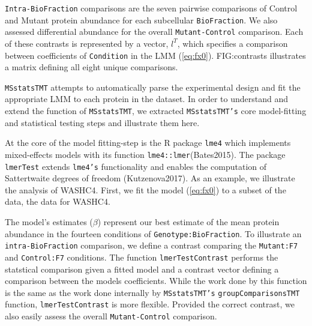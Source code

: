 \documentclass[11pt]{elife}
\begin{document}
\texttt{Intra-BioFraction} comparisons are the seven pairwise comparisons of 
Control and Mutant protein abundance for each subcellular
\texttt{BioFraction}. We also assessed differential abundance for the 
overall \texttt{Mutant-Control} comparison. Each of these contrasts is 
represented by a vector, $l^T$, which specifies a comparison between 
coefficients of \texttt{Condition} in the LMM (\ref{eq:fx0}).
FIG:contrasts illustrates a matrix defining all eight unique comparisons.

\texttt{MSstatsTMT} attempts to automatically parse the experimental design and
fit the appropriate LMM to each protein in the dataset. In order to understand 
and extend the function of \texttt{MSstatsTMT}, 
we extracted \texttt{MSstatsTMT's} core model-fitting and statistical 
testing steps and illustrate them here.

At the core of the model fitting-step is the R package \texttt{lme4} which
implements mixed-effects models with its function \texttt{lme4::lmer}(Bates2015). The
package \texttt{lmerTest} extends \texttt{lme4's} functionality and enables the
computation of Sattertwaite degrees of freedom (Kutzenova2017). As an example,
we illustrate the analysis of WASHC4. First, we fit the model (\ref{eq:fx0}) to
a subset of the data, the data for WASHC4. 





The model's estimates ($\beta$) represent our best estimate of the mean protein
abundance in the fourteen conditions of \texttt{Genotype:BioFraction}. 
To illustrate an \texttt{intra-BioFraction} comparison, we 
define a contrast comparing the \texttt{Mutant:F7} and \texttt{Control:F7}
conditions. The function \texttt{lmerTestContrast} performs the statstical comparison given
a fitted model and a contrast vector defining a comparison between the models
coefficients. While the work done by this function 
is the same as the work done internally by \texttt{MSstatsTMT's}
\texttt{groupComparisonsTMT} function, \texttt{lmerTestContrast} is more
flexible. Provided the correct contrast, we also easily assess the overall
\texttt{Mutant-Control} comparison.\\
\end{document}
